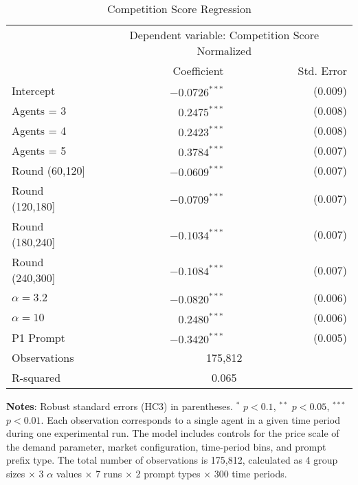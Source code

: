 \begin{table}[H]
    \centering
    \caption{Competition Score Regression}
    \label{tab:ols_contrastive_score}
    \begin{threeparttable}
    {\small
    \begin{tabular}{l@{\hspace{0.9cm}}rr}
    \toprule
    & \multicolumn{2}{c}{Dependent variable: Competition Score Normalized} \\
    \cmidrule(lr){2-3}
    & Coefficient & Std. Error \\
    \midrule
    Intercept                            & $-0.0726^{***}$ & (0.009) \\
    Agents = 3                           & $0.2475^{***}$  & (0.008) \\
    Agents = 4                           & $0.2423^{***}$  & (0.008) \\
    Agents = 5                           & $0.3784^{***}$  & (0.007) \\
    Round (60,120]                       & $-0.0609^{***}$ & (0.007) \\
    Round (120,180]                      & $-0.0709^{***}$ & (0.007) \\
    Round (180,240]                      & $-0.1034^{***}$ & (0.007) \\
    Round (240,300]                      & $-0.1084^{***}$ & (0.007) \\
    $\alpha= 3.2$                        & $-0.0820^{***}$ & (0.006) \\
    $\alpha= 10$                         & $0.2480^{***}$  & (0.006) \\
    P1 Prompt                            & $-0.3420^{***}$ & (0.005) \\
    \midrule
    Observations                             & \multicolumn{2}{c}{175,812} \\
    R-squared                               & \multicolumn{2}{c}{0.065} \\
    \bottomrule
    \end{tabular}
    }
    \begin{tablenotes}[flushleft]
    \footnotesize
    \item \textbf{Notes}: Robust standard errors (HC3) in parentheses. $^{*}$ $p<0.1$, $^{**}$ $p<0.05$, $^{***}$ $p<0.01$. Each observation corresponds to a single agent in a given time period during one experimental run. The model includes controls for the price scale of the demand parameter, market configuration, time-period bins, and prompt prefix type. The total number of observations is 175{,}812, calculated as 4 group sizes $\times$ 3 $\alpha$ values $\times$ 7 runs $\times$ 2 prompt types $\times$ 300 time periods.

    \end{tablenotes}
    \end{threeparttable}
\end{table}


